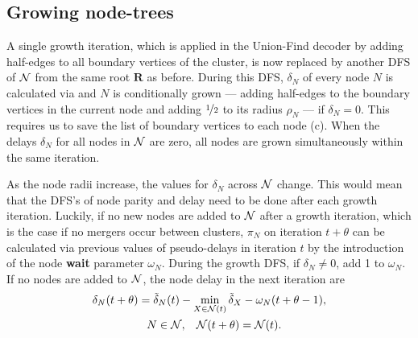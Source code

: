 \subsection{Growing node-trees}\label{sec:grownodetrees}

A single growth iteration, which is applied in the Union-Find decoder by adding half-edges to all boundary vertices of the cluster, is now replaced by another DFS of $\mathcal{N}$ from the same root $\mathbf{R}$ as before. During this DFS, $\delta_N$ of every node $N$ is calculated via  and $N$ is conditionally grown --- adding half-edges to the boundary vertices in the current node and adding $\nicefrac{1}{2}$ to its radius $\rho_N$ --- if $\delta_N = 0$. This requires us to save the list of boundary vertices to each node (c). When the delays $\delta_N$ for all nodes in $\mathcal{N}$ are zero, all nodes are grown simultaneously within the same iteration. 

As the node radii increase, the values for $\delta_N$ across $\mathcal{N}$ change. This would mean that the DFS's of node parity and delay need to be done after each growth iteration. Luckily, if no new nodes are added to $\mathcal{N}$ after a growth iteration, which is the case if no mergers occur between clusters, $\pi_N$ on iteration $t+\theta$ can be calculated via previous values of pseudo-delays in iteration $t$ by the introduction of the node \textbf{wait} parameter $\omega_N$. During the growth DFS, if $\delta_N \neq 0$, add 1 to $\omega_N$. If no nodes are added to $\mathcal{N}$, the node delay in the next iteration are
\begin{multline}\label{eq:delay}
    \delta_N(t+\theta) = \tilde{\delta}_N(t) - \min_{X \in \mathcal{N}(t)}{\tilde{\delta}_X} - \omega_N(t+\theta-1),  \\
    \hspace{.3cm} N \in \mathcal{N}, \hspace{.3cm} \mathcal{N}(t+\theta) = \mathcal{N}(t).  
\end{multline}


